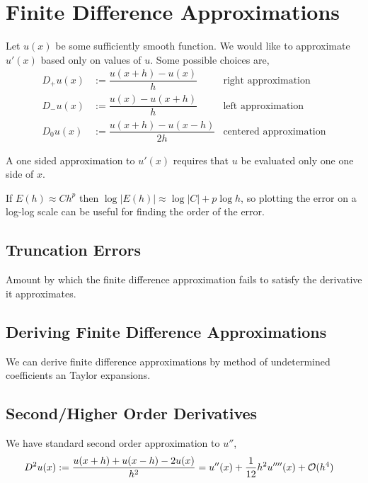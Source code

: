 \documentclass[12pt]{article}
\begin{document}
\section{Finite Difference Approximations}
Let \( u(x) \) be some sufficiently smooth function.  We would like to approximate \( u'(x) \) based only on values of \( u \). Some possible choices are,
\begin{align*}
    D_+ u(x) &:= \dfrac{u(x+h)-u(x)}{h} & \text{right approximation} \\
    D_- u(x) &:= \dfrac{u(x) - u(x+h)}{h} & \text{left approximation}\\
    D_0 u(x) &:= \dfrac{u(x+h)-u(x-h)}{2h} & \text{centered approximation}
\end{align*}

\begin{definition}
A one sided approximation to \( u'(x) \) requires that \( u \) be evaluated only one one side of \( x \).
\end{definition}

If \( E(h) \approx Ch^p \) then \( \log|E(h)| \approx \log|C| + p\log h \), so plotting the error on a log-log scale can be useful for finding the order of the error.

\subsection{Truncation Errors}
\begin{definition}
Amount by which the finite difference approximation fails to satisfy the derivative it approximates.
\end{definition}


\subsection{Deriving Finite Difference Approximations}
We can derive finite difference approximations by method of undetermined coefficients an Taylor expansions.


\subsection{Second/Higher Order Derivatives}
We have standard second order approximation to \( u'' \),
\begin{align*}
D^2 u(x) &:= \dfrac{u(x+h)+u(x-h)-2u(x) }{h^2}  = u''(x) +\dfrac{1}{12}h^2 u''''(x) + \mathcal{O}(h^4)
\end{align*}
\end{document}

